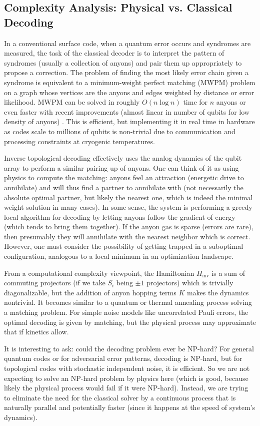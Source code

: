 \documentclass[11pt]{article}
\begin{document}
\subsection{Complexity Analysis: Physical vs. Classical Decoding}
In a conventional surface code, when a quantum error occurs and syndromes are measured, the task of the classical decoder is to interpret the pattern of syndromes (usually a collection of anyons) and pair them up appropriately to propose a correction. The problem of finding the most likely error chain given a syndrome is equivalent to a minimum-weight perfect matching (MWPM) problem on a graph whose vertices are the anyons and edges weighted by distance or error likelihood. MWPM can be solved in roughly $O(n \log n)$ time for $n$ anyons or even faster with recent improvements (almost linear in number of qubits for low density of anyons) \cite{Higgott2022}. This is efficient, but implementing it in real time in hardware as codes scale to millions of qubits is non-trivial due to communication and processing constraints at cryogenic temperatures.

Inverse topological decoding effectively uses the analog dynamics of the qubit array to perform a similar pairing up of anyons. One can think of it as using physics to compute the matching: anyons feel an attraction (energetic drive to annihilate) and will thus find a partner to annihilate with (not necessarily the absolute optimal partner, but likely the nearest one, which is indeed the minimal weight solution in many cases). In some sense, the system is performing a greedy local algorithm for decoding by letting anyons follow the gradient of energy (which tends to bring them together). If the anyon gas is sparse (errors are rare), then presumably they will annihilate with the nearest neighbor which is correct. However, one must consider the possibility of getting trapped in a suboptimal configuration, analogous to a local minimum in an optimization landscape.

From a computational complexity viewpoint, the Hamiltonian $H_{\mathrm{inv}}$ is a sum of commuting projectors (if we take $S_i$ being $\pm 1$ projectors) which is trivially diagonalizable, but the addition of anyon hopping terms $K$ makes the dynamics nontrivial. It becomes similar to a quantum or thermal annealing process solving a matching problem. For simple noise models like uncorrelated Pauli errors, the optimal decoding is given by matching, but the physical process may approximate that if kinetics allow.

It is interesting to ask: could the decoding problem ever be NP-hard? For general quantum codes or for adversarial error patterns, decoding is NP-hard, but for topological codes with stochastic independent noise, it is efficient. So we are not expecting to solve an NP-hard problem by physics here (which is good, because likely the physical process would fail if it were NP-hard). Instead, we are trying to eliminate the need for the classical solver by a continuous process that is naturally parallel and potentially faster (since it happens at the speed of system's dynamics).
\end{document}
